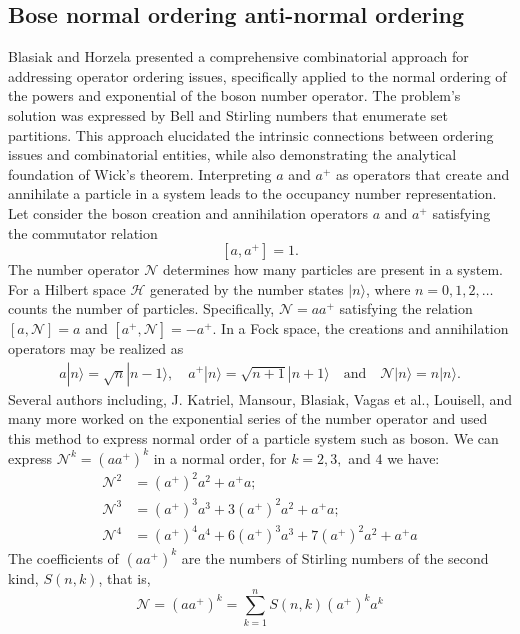 \documentclass[pdflatex,sn-mathphys-num]{sn-jnl}%
\theoremstyle{thmstyleone}%
\theoremstyle{thmstyletwo}%
\theoremstyle{thmstylethree}%
\begin{document}
\subsection{Bose normal ordering anti-normal ordering}
Blasiak and Horzela \cite{blasiak2007combinatorics} presented a comprehensive combinatorial approach for addressing operator ordering issues, specifically applied to the normal ordering of the powers and exponential of the boson number operator. The problem's solution was expressed by Bell and Stirling numbers that enumerate set partitions. This approach elucidated the intrinsic connections between ordering issues and combinatorial entities, while also demonstrating the analytical foundation of Wick’s theorem.
Interpreting $a$ and $a^{\mathbb{+}}$ as operators that create and annihilate a particle in a system leads to the occupancy number representation.
Let consider the boson creation and annihilation operators $a$ and $a^{\mathbb{+}}$ satisfying the commutator relation
$$[a, a^{\mathbb{+}}]=1.$$
The number operator $\mathcal{N}$ determines how many particles are present in a system. For a Hilbert space $\mathcal{H}$ generated by the number states $|n\rangle$, where $n = 0, 1, 2,\ldots$ counts the number of particles. Specifically,
$\mathcal{N}=a a^{\mathbb{+}}$ satisfying the relation $[a, \mathcal{N}]=a$ and $[a^{\mathbb{+}}, \mathcal{N}]=-a^{\mathbb{+}}$. In a Fock space, the creations and annihilation operators may be realized as
\begin{align*}
    a|n\rangle= \sqrt{n}|n-1\rangle, \quad  a^{\mathbb{+}}|n\rangle= \sqrt{n+1}|n+1\rangle \quad \mbox{and} \quad \mathcal{N}|n\rangle=n|n\rangle.
\end{align*}
Several authors including, J. Katriel, Mansour, Blasiak, Vagas et al., Louisell, and many more \cite{vargas2006normal, penson2002combinatorics, louisell1973quantum} \cite{blasiak2005combinatorics,blasiak2007combinatorics, mansour2016commutation, MANSOUR2007214, katriel2000bell, blasiak2006dobinski} worked on the exponential series of the number operator and used this method to express normal order of a particle system such as boson.
We can express $\mathcal{N}^k=(a a^{\mathbb{+}})^k$ in a normal order, for $k=2, 3,$
and $4$ we have: 
\begin{align*}
    \mathcal{N}^2&=(a^{\mathbb{+}})^2 a^2+a^{\mathbb{+}}a;\\
    \mathcal{N}^3&=(a^{\mathbb{+}})^3 a^3+3(a^{\mathbb{+}})^2 a^2+a^{\mathbb{+}}a;\\
    \mathcal{N}^4&=(a^{\mathbb{+}})^4 a^4+6(a^{\mathbb{+}})^3 a^3+7(a^{\mathbb{+}})^2 a^2+a^{\mathbb{+}}a
\end{align*}
The coefficients of $(a a^{\mathbb{+}})^k$ are the numbers of Stirling numbers of the second kind, $S(n,k)$, that is, 
$$ \mathcal{N}=(a a^{\mathbb{+}})^k=\sum_{k = 1}^{n} S(n, k) (a^{\mathbb{+}})^k a^k$$
\end{document}
